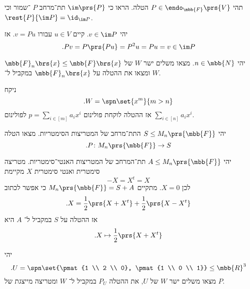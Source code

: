 \documentclass[a4paper,10pt,oneside,openany]{article}
\begin{document}
\begin{exercise}
תהי
$P \in \endo_{\mbb{F}}\prs{V}$
הטלה.
הראו כי
$\im\prs{P}$
תת־מרחב
$P$%
־שמור וכי
$\rest{P}{\im P} = \id_{\im P}$.
\end{exercise}

\begin{solution}
יהי
$v \in \im P$.
קיים
$u \in V$
עבורו
$v = Pu$.
אז
\[\text{.} Pv = P\prs{P u} = P^2 u = Pu = v \in \im P\]
\end{solution}

\begin{exercise}
יהי
$n \in \mbb{N}$.
מצאו משלים ישר
$W$
של
$\mbb{F}_n\brs{x} \leq \mbb{F}\brs{x}$
ומצאו את ההטלה על
$\mbb{F}_n\brs{x}$
במקביל ל־%
$W$.
\end{exercise}

\begin{solution}
ניקח
\[\text{.} W = \spn\set{x^m}{m > n}\]
אז ההטלה לוקחת פולינום
$p = \sum_{i \in [m]} a_i x^i$
לפולינום
$\sum_{i \in [n]} a_i x^i$.
\end{solution}

\begin{exercise}
יהי
$S \leq M_n\prs{\mbb{F}}$
התת־מרחב של המטריצות הסימטריות.
מצאו הטלה
\[\text{.} P \colon M_n\prs{\mbb{F}} \to S\]
\end{exercise}

\begin{solution}
יהי
$A \leq M_n\prs{\mbb{F}}$
תת־המרחב של המטריצות האנטי־סימטריות.
מטריצה סימטרית ואנטי סימטרית
$X$
מקיימת
\[-X = X^t = X\]
לכן
$X = 0$.
מתקיים
$M_n\prs{\mbb{F}} = S + A$
כי אפשר לכתוב
\[\text{.} X = \frac{1}{2} \prs{X + X^t} + \frac{1}{2} \prs{X - X^t}\]
אז ההטלה על
$S$
במקביל ל־%
$A$
היא
\[\text{.} X \mapsto \frac{1}{2} \prs{X + X^t}\]
\end{solution}

\begin{exercise}
יהי
\[\text{.} U = \spn\set{\pmat{1 \\ 2 \\ 0}, \pmat{1 \\ 0 \\ 1}} \leq \mbb{R}^3\]
מצאו משלים ישר
$W$
של
$U$,
את ההטלה
$P_U$
במקביל ל־%
$W$
ומטריצה מייצגת של
$P$.
\end{exercise}
\end{document}
